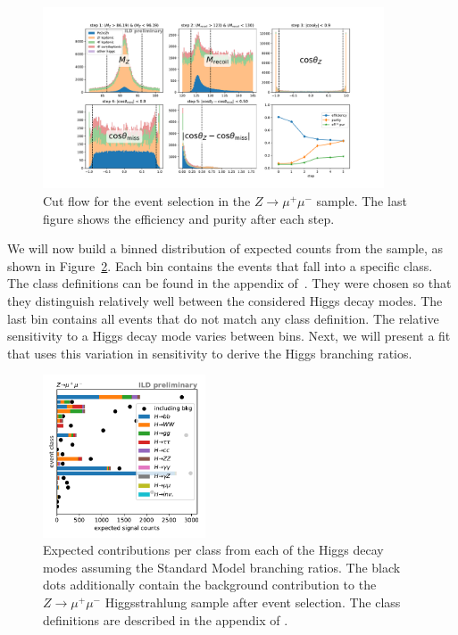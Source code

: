 \documentclass[a4paper,11pt]{article}
\begin{document}
\begin{figure}[ht]
    \centering
    \includegraphics[width=0.9\textwidth, keepaspectratio]{presel_e2e2_for_proceedings}
    \caption{
        Cut flow for the event selection in the $Z \to \mu^+ \mu^-$ sample.
        The last figure shows the efficiency and purity after each step.
    }\label{fig:presel}
\end{figure}

We will now build a binned distribution of expected counts from the sample,
as shown in Figure~\ref{fig:box_counts}.
Each bin contains the events that fall into a specific class.
The class definitions can be found in the appendix of~\cite{LCWS_combined_Higgs}.
They were chosen so that they distinguish
relatively well between the considered Higgs decay modes.
The last bin contains all events that do not match any class definition.
The relative sensitivity to a Higgs decay mode varies between bins.
Next, we will present a fit that uses this variation in sensitivity
to derive the Higgs branching ratios.

\begin{figure}[ht]
    \centering
    \includegraphics[width=0.43\textwidth, keepaspectratio]{intro_category_counts_w_bkg}
    \caption{
        Expected contributions per class from each of the Higgs decay modes
        assuming the Standard Model branching ratios.
        The black dots additionally contain the background contribution
        to the $Z \to \mu^+\mu^-$ Higgsstrahlung sample after event selection.
        The class definitions are described in the appendix of \cite{LCWS_combined_Higgs}.
    }\label{fig:box_counts}
\end{figure}
\end{document}
